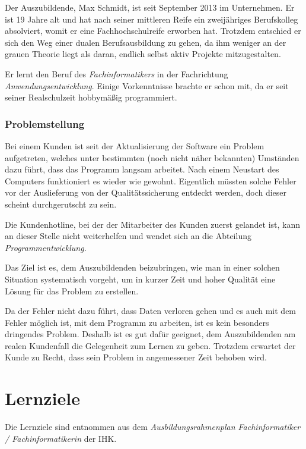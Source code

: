 \documentclass[11pt,a4paper,notitlepage,ngerman]{article}
\begin{document}
Der Auszubildende, Max Schmidt, ist seit September 2013 im Unternehmen. Er ist
19 Jahre alt und hat nach seiner mittleren Reife ein zweijähriges Berufskolleg
absolviert, womit er eine Fachhochschulreife erworben hat. Trotzdem entschied er sich
den Weg einer dualen Berufsausbildung zu gehen, da ihm weniger an der grauen
Theorie liegt als daran, endlich selbst aktiv Projekte mitzugestalten.

Er lernt den Beruf des \emph{Fachinformatikers} in der Fachrichtung \emph{Anwendungsentwicklung}.
Einige Vorkenntnisse brachte er schon mit, da er seit seiner Realschulzeit
hobbymäßig programmiert. 

\subsubsection{Problemstellung}

Bei einem Kunden ist seit der Aktualisierung der Software ein Problem aufgetreten,
welches unter bestimmten (noch nicht näher bekannten) Umständen dazu führt,
dass das Programm langsam arbeitet. Nach einem Neustart des Computers funktioniert
es wieder wie gewohnt. Eigentlich müssten solche Fehler vor der Auslieferung von der Qualitätssicherung entdeckt werden, doch dieser scheint 
\glqq durchgerutscht\grqq{} zu sein.

Die Kundenhotline, bei der der Mitarbeiter des Kunden zuerst gelandet ist, kann
an dieser Stelle nicht weiterhelfen und wendet sich an die Abteilung 
\emph{Programmentwicklung}.

Das Ziel ist es, dem Auszubildenden beizubringen, wie man in einer solchen Situation
systematisch vorgeht, um in kurzer Zeit und hoher Qualität eine Lösung für das Problem
zu erstellen.

Da der Fehler nicht dazu führt, dass Daten verloren gehen und es auch mit dem
Fehler möglich ist, mit dem Programm zu arbeiten, ist es kein besonders dringendes
Problem. Deshalb ist es gut dafür geeignet, dem Auszubildenden am realen Kundenfall
die Gelegenheit zum Lernen zu geben. Trotzdem erwartet der Kunde zu Recht, dass
sein Problem in angemessener Zeit behoben wird.

\section{Lernziele}

Die Lernziele sind entnommen aus dem \emph{Ausbildungsrahmenplan Fachinformatiker / Fachinformatikerin} der IHK.
\end{document}
